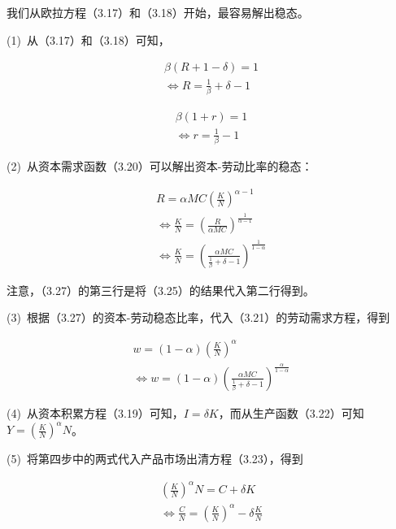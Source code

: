 \documentclass[cn,10pt,math=newtx,citestyle=gb7714-2015,bibstyle=gb7714-2015]{elegantbook}
\begin{document}
	我们从欧拉方程（3.17）和（3.18）开始，最容易解出稳态。
	
	(1)~从（3.17）和（3.18）可知，
	
	\begin{equation}\label{label}
		\begin{split}
			\beta(R+1-\delta)=1\\
			\Leftrightarrow R=\frac{1}{\beta}+\delta-1
		\end{split}
	\end{equation}
	
	\begin{equation}\label{label}
		\begin{split}
			\beta(1+r)=1\\
			\Leftrightarrow r=\frac{1}{\beta}-1
		\end{split}
	\end{equation}
	
	(2)~从资本需求函数（3.20）可以解出资本-劳动比率的稳态：
	
	\begin{equation}\label{label}
		\begin{split}
			R=\alpha MC(\frac{K}{N})^{\alpha-1}\\
			\Leftrightarrow \frac{K}{N}=(\frac{R}{\alpha MC})^{\frac{1}{\alpha-1}}\\
			\Leftrightarrow \frac{K}{N}=(\frac{\alpha MC}{\frac{1}{\beta}+\delta-1})^{\frac{1}{1-\alpha}}
		\end{split}
	\end{equation}
	
	注意，（3.27）的第三行是将（3.25）的结果代入第二行得到。
	
	(3)~根据（3.27）的资本-劳动稳态比率，代入（3.21）的劳动需求方程，得到
	
	\begin{equation}\label{label}
		\begin{split}
			w=(1-\alpha)(\frac{K}{N})^{\alpha}\\
			\Leftrightarrow w=(1-\alpha)(\frac{\alpha MC}{\frac{1}{\beta}+\delta-1})^{\frac{\alpha}{1-\alpha}}
		\end{split}
	\end{equation}
	
	(4)~从资本积累方程（3.19）可知，$I=\delta K$，而从生产函数（3.22）可知$Y=(\frac{K}{N})^{\alpha}N$。
	
	(5)~将第四步中的两式代入产品市场出清方程（3.23），得到
	
	\begin{equation}\label{label}
		\begin{split}
			(\frac{K}{N})^{\alpha}N=C+\delta K\\
			\Leftrightarrow \frac{C}{N}=(\frac{K}{N})^{\alpha}-\delta \frac{K}{N}
		\end{split}
	\end{equation}
	
\end{document}
